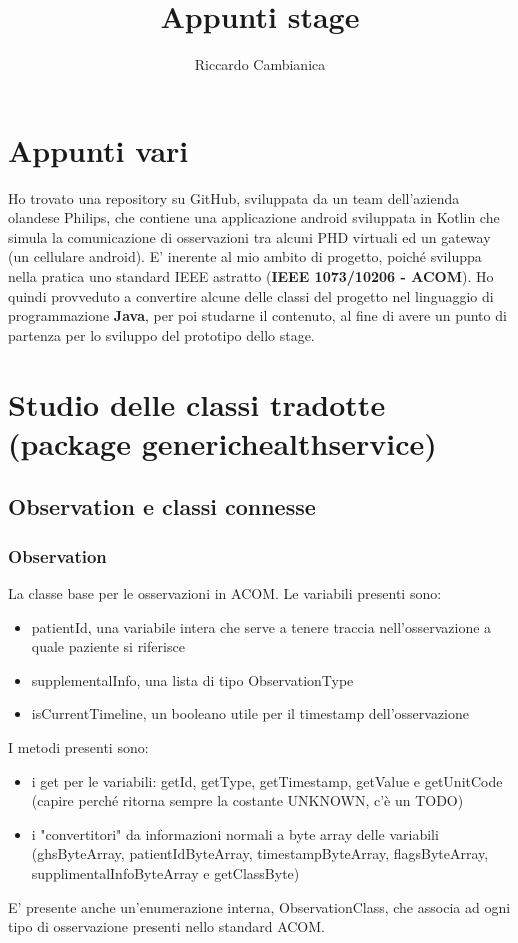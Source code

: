 \documentclass[a4paper]{article}
\title{Appunti stage}
\author{Riccardo Cambianica}
\begin{document}
    \maketitle
    \tableofcontents
    \newpage
    \section{Appunti vari}
        Ho trovato una repository su GitHub, sviluppata da un team dell'azienda olandese Philips,
        che contiene una applicazione android sviluppata in Kotlin che simula la comunicazione di osservazioni tra
        alcuni PHD virtuali ed un gateway (un cellulare android).
        E' inerente al mio ambito di progetto, poiché sviluppa nella pratica uno standard IEEE 
        astratto (\textbf{IEEE 1073/10206 - ACOM}).
        Ho quindi provveduto a convertire alcune delle classi del progetto nel linguaggio di programmazione
        \textbf{Java}, per poi studarne il contenuto, al fine di avere un punto di partenza per lo sviluppo del prototipo
        dello stage.     
    \section{Studio delle classi tradotte (package generichealthservice)}
        \subsection{Observation e classi connesse}
        \subsubsection{Observation}
            La classe base per le osservazioni in ACOM.
            Le variabili presenti sono:
            \begin{itemize}
                \item patientId, una variabile intera che serve a tenere traccia nell'osservazione a quale paziente si riferisce
                \item supplementalInfo, una lista di tipo ObservationType
                \item isCurrentTimeline, un booleano utile per il timestamp dell'osservazione
            \end{itemize}
            I metodi presenti sono:
            \begin{itemize}
                \item i get per le variabili: getId, getType, getTimestamp, getValue e getUnitCode (capire perché ritorna sempre la costante UNKNOWN, c'è un TODO)
                \item i "convertitori" da informazioni normali a byte array delle variabili 
                (ghsByteArray, patientIdByteArray, timestampByteArray, flagsByteArray, supplimentalInfoByteArray e getClassByte) 
            \end{itemize}
            E' presente anche un'enumerazione interna, ObservationClass, che associa ad ogni tipo di osservazione presenti nello standard ACOM.
\end{document}
